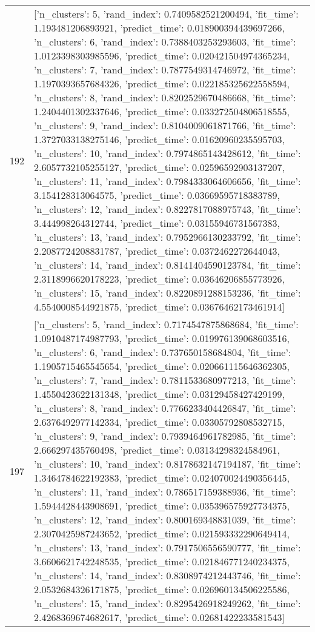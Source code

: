 \begin{tabular}{rl}
192 & [{'n_clusters': 5, 'rand_index': 0.7409582521200494, 'fit_time': 1.193481206893921, 'predict_time': 0.018900394439697266}, {'n_clusters': 6, 'rand_index': 0.7388403253293603, 'fit_time': 1.0123398303985596, 'predict_time': 0.020421504974365234}, {'n_clusters': 7, 'rand_index': 0.7877549314746972, 'fit_time': 1.1970393657684326, 'predict_time': 0.022185325622558594}, {'n_clusters': 8, 'rand_index': 0.8202529670486668, 'fit_time': 1.2404401302337646, 'predict_time': 0.033272504806518555}, {'n_clusters': 9, 'rand_index': 0.8104009061871766, 'fit_time': 1.3727033138275146, 'predict_time': 0.01620960235595703}, {'n_clusters': 10, 'rand_index': 0.7974865143428612, 'fit_time': 2.6057732105255127, 'predict_time': 0.02596592903137207}, {'n_clusters': 11, 'rand_index': 0.7984333064606656, 'fit_time': 3.154128313064575, 'predict_time': 0.03669595718383789}, {'n_clusters': 12, 'rand_index': 0.8227817088975743, 'fit_time': 3.444998264312744, 'predict_time': 0.03155946731567383}, {'n_clusters': 13, 'rand_index': 0.7952966130233792, 'fit_time': 2.2087724208831787, 'predict_time': 0.0372462272644043}, {'n_clusters': 14, 'rand_index': 0.8141404590123784, 'fit_time': 2.3118996620178223, 'predict_time': 0.03646206855773926}, {'n_clusters': 15, 'rand_index': 0.8220891288153236, 'fit_time': 4.5540008544921875, 'predict_time': 0.03676462173461914}] \\
197 & [{'n_clusters': 5, 'rand_index': 0.7174547875868684, 'fit_time': 1.0910487174987793, 'predict_time': 0.019976139068603516}, {'n_clusters': 6, 'rand_index': 0.737650158684804, 'fit_time': 1.1905715465545654, 'predict_time': 0.020661115646362305}, {'n_clusters': 7, 'rand_index': 0.7811533680977213, 'fit_time': 1.4550423622131348, 'predict_time': 0.03129458427429199}, {'n_clusters': 8, 'rand_index': 0.7766233404426847, 'fit_time': 2.6376492977142334, 'predict_time': 0.03305792808532715}, {'n_clusters': 9, 'rand_index': 0.7939464961782985, 'fit_time': 2.666297435760498, 'predict_time': 0.03134298324584961}, {'n_clusters': 10, 'rand_index': 0.8178632147194187, 'fit_time': 1.3464784622192383, 'predict_time': 0.024070024490356445}, {'n_clusters': 11, 'rand_index': 0.786517159388936, 'fit_time': 1.5944428443908691, 'predict_time': 0.035396575927734375}, {'n_clusters': 12, 'rand_index': 0.800169348831039, 'fit_time': 2.3070425987243652, 'predict_time': 0.021593332290649414}, {'n_clusters': 13, 'rand_index': 0.7917506556590777, 'fit_time': 3.6606621742248535, 'predict_time': 0.021846771240234375}, {'n_clusters': 14, 'rand_index': 0.8308974212443746, 'fit_time': 2.0532684326171875, 'predict_time': 0.026960134506225586}, {'n_clusters': 15, 'rand_index': 0.8295426918249262, 'fit_time': 2.4268369674682617, 'predict_time': 0.02681422233581543}] \\
\bottomrule
\end{tabular}
